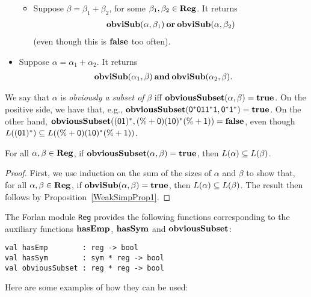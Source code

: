 \begin{itemize}
\begin{itemize}
\item Suppose $\beta = \beta_1 + \beta_2$, for some $\beta_1,\beta_2\in\mathbf{Reg}$.
It returns
\begin{gather*}
\mathbf{obviSub}(\alpha, \beta_1) \mathbin{\mathbf{or}} \mathbf{obviSub}(\alpha, \beta_2)
\end{gather*}
(even though this is $\mathbf{false}$ too often).
\end{itemize}

\item Suppose $\alpha=\alpha_1+\alpha_2$. It returns
\begin{gather*}
\mathbf{obviSub}(\alpha_1, \beta) \mathbin{\mathbf{and}} \mathbf{obviSub}(\alpha_2, \beta) .
\end{gather*}
\end{itemize}

We say that $\alpha$ is \emph{obviously a subset of} $\beta$ iff
$\mathbf{obviousSubset}(\alpha,\beta)=\mathbf{true}$. On the positive side, we have
that, e.g.,
$\mathbf{obviousSubset}(\mathsf{0^*011^*1},\mathsf{0^*1^*})=\mathbf{true}$.  On the
other hand, $\mathbf{obviousSubset}(\mathsf{(01)^*},\mathsf{(\% + 0)(10)^*(\%
  + 1)})=\mathbf{false}$, even though $L(\mathsf{(01)^*})\subseteq L(\mathsf{(\% +
  0)(10)^*(\% + 1)})$.

\begin{proposition}
\label{WeakSubProp}
For all $\alpha,\beta\in\mathbf{Reg}$, if $\mathbf{obviousSubset}(\alpha,\beta)=\mathbf{true}$,
then $L(\alpha)\subseteq L(\beta)$.
\end{proposition}

\begin{proof}
First, we use induction on the sum of the sizes of $\alpha$ and
$\beta$ to show that, for all $\alpha,\beta\in\mathbf{Reg}$, if
$\mathbf{obviSub}(\alpha,\beta)=\mathbf{true}$, then $L(\alpha)\subseteq L(\beta)$.
The result then follows by Proposition~\ref{WeakSimpProp1}.
\end{proof}

The Forlan module \texttt{Reg} provides the following functions
corresponding to the auxiliary functions $\mathbf{hasEmp}$, $\mathbf{hasSym}$ and
$\mathbf{obviousSubset}$:
\begin{verbatim}
val hasEmp        : reg -> bool
val hasSym        : sym * reg -> bool
val obviousSubset : reg * reg -> bool
\end{verbatim}
%
%
%
Here are some examples of how they can be used:


